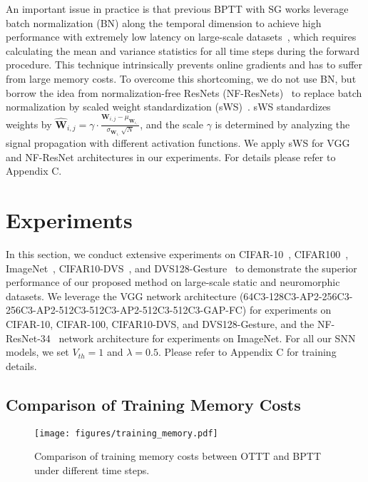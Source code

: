 \documentclass{article}
\begin{document}
An important issue in practice is that previous BPTT with SG works leverage batch normalization (BN) along the temporal dimension to achieve high performance with extremely low latency on large-scale datasets~\cite{zheng2020going,li2021differentiable,fang2021deep,deng2021temporal}, which requires calculating the mean and variance statistics for all time steps during the forward procedure. This technique intrinsically prevents online gradients and has to suffer from large memory costs. To overcome this shortcoming, we do not use BN, but borrow the idea from normalization-free ResNets (NF-ResNets)~\cite{brock2021characterizing,brock2021high} to replace batch normalization by scaled weight standardization (sWS)~\cite{qiao2019weight}. sWS standardizes weights by $\hat{\mathbf{W}}_{i,j}=\gamma \cdot \frac{\mathbf{W}_{i,j}-\mu_{\mathbf{W}_{i,\cdot}}}{\sigma_{\mathbf{W}_{i,\cdot}}\sqrt{N}}$, and the scale $\gamma$ is determined by analyzing the signal propagation with different activation functions. We apply sWS for VGG~\cite{simonyan2014very} and NF-ResNet architectures in our experiments. For details please refer to Appendix C.

\section{Experiments}\label{sec:exp}
\vspace{-2mm}

In this section, we conduct extensive experiments on CIFAR-10~\cite{krizhevsky2009learning}, CIFAR100~\cite{krizhevsky2009learning}, ImageNet~\cite{deng2009imagenet}, CIFAR10-DVS~\cite{li2017cifar10}, and DVS128-Gesture~\cite{amir2017low} to demonstrate the superior performance of our proposed method on large-scale static and neuromorphic datasets. We leverage the VGG network architecture (64C3-128C3-AP2-256C3-256C3-AP2-512C3-512C3-AP2-512C3-512C3-GAP-FC) for experiments on CIFAR-10, CIFAR-100, CIFAR10-DVS, and DVS128-Gesture, and the NF-ResNet-34~\cite{brock2021characterizing} network architecture for experiments on ImageNet. For all our SNN models, we set $V_{th}=1$ and $\lambda=0.5$. Please refer to Appendix C for training details.

\subsection{Comparison of Training Memory Costs}
\vspace{-2mm}

\begin{figure}[h]
\vspace{-1.5mm}
    \centering
    \texttt{[image: figures/training\_memory.pdf]}
    \caption{Comparison of training memory costs between OTTT and BPTT under different time steps.}
    \label{fig:training memory}
\vspace{-1.5mm}
\end{figure}
\end{document}
